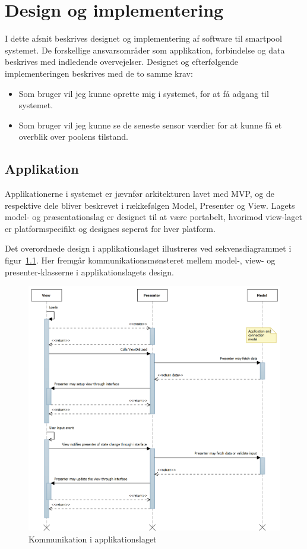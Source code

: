 \chapter{Design og implementering}\label{cha:design}
I dette afsnit beskrives designet og implementering af software til \gls{smartpool} systemet. De forskellige ansvarsområder som applikation, forbindelse og data beskrives med indledende overvejelser. 
Designet og efterfølgende implementeringen beskrives med de to samme krav: 

\begin{itemize}
	\item Som bruger vil jeg kunne oprette mig i systemet, for at få adgang til systemet.
	\item Som bruger vil jeg kunne se de seneste sensor værdier for at kunne få et overblik over 
	poolens tilstand.
\end{itemize}

\section{Applikation}
Applikationerne i systemet er jævnfør arkitekturen lavet med MVP, og de respektive dele bliver beskrevet i rækkefølgen Model, Presenter og View. Lagets model- og præsentationslag er designet til at være portabelt, hvorimod view-laget er platformspecifikt og designes seperat for hver platform. 

Det overordnede design i applikationslaget illustreres ved sekvensdiagrammet i figur~\ref{fig:application_sd}. Her fremgår kommunikationsmønsteret mellem model-, view- og presenter-klasserne i applikationslagets design.

\begin{figure}
	\centering
	\includegraphics[width=1.0\linewidth]{figs/design/application_sd}
	\caption{Kommunikation i applikationslaget}
	\label{fig:application_sd}
\end{figure}

